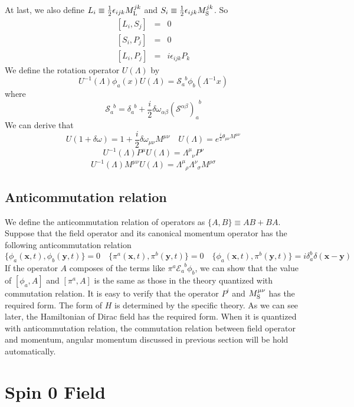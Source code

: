 At last, we also define $L_i \equiv \frac{1}{2} \epsilon_{ijk} M_{\rm L}^{jk}$ and $S_i \equiv \frac{1}{2} \epsilon_{ijk} M_{\rm S}^{jk}$. So
\begin{eqnarray}
\left[L_i,S_j\right] &=& 0 \nonumber \\
\left[S_i,P_j\right] &=& 0 \nonumber \\
\left[L_i,P_j\right] &=& i\epsilon_{ijk}P_k \nonumber
\end{eqnarray}
We define the rotation operator $U(\Lambda)$ by
\[U^{-1}(\Lambda) \phi_a(x) U(\Lambda) = \mathscr{S}_{a}^{\phantom{a}b}\phi_b(\Lambda^{-1}x)\]
where
\[\mathscr{S}_{a}^{\phantom{a}b} = \delta_{a}^{\phantom{a}b}+\frac{i}{2} \delta \omega_{\alpha \beta} (\mathcal{S}^{\alpha \beta})_{a}^{\phantom{a}b} \]
We can derive that
\[U(1+\delta \omega) = 1 + \frac{i}{2} \delta \omega_{\mu \nu} M^{\mu \nu} \quad U(\Lambda) = e^{\frac{i}{2} \theta_{\mu \nu} M^{\mu \nu}}\]
\[U^{-1}(\Lambda) P^{\mu} U(\Lambda) = \Lambda^{\mu}_{\phantom{\mu}\nu} P^{\nu}\]
\[U^{-1}(\Lambda) M^{\mu \nu} U(\Lambda) = \Lambda^{\mu}_{\phantom{\mu}\rho} \Lambda^{\nu}_{\phantom{\nu}\sigma}M^{\rho \sigma}\]

\section{Anticommutation relation}
\noindent
We define the anticommutation relation of operators as $\{A,B\} \equiv AB + BA$. Suppose that the field operator and its canonical momentum operator has the following anticommutation relation
\[\{\phi_a(\bm{x},t),\phi_b(\bm{y},t)\} = 0 \quad \{\pi^a(\bm{x},t),\pi^b(\bm{y},t)\} = 0 \quad \{\phi_a(\bm{x},t),\pi^b(\bm{y},t)\} = i \delta_a^b \delta(\bm{x}-\bm{y}) \]
If the operator $A$ composes of the terms like $\pi^a \mathcal{E}_a^{\phantom{a}b} \phi_b$, we can show that the value of $[\phi_a,A]$ and $[\pi^a,A]$ is the same as those in the theory quantized with commutation relation. It is easy to verify that the operator $P^i$ and $M_{\rm S}^{\mu \nu}$ has the required form. The form of $H$ is determined by the specific theory. As we can see later, the Hamiltonian of Dirac field  has the required form. When it is quantized with anticommutation relation, the commutation relation between field operator and momentum, angular momentum discussed in previous section will be hold automatically. 

\chapter{Spin 0 Field}
